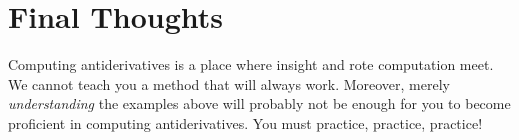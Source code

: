 \documentclass{ximera}
\begin{document}
\section{Final Thoughts}
Computing antiderivatives is a place where insight and rote
computation meet. We cannot teach you a method that will always
work. Moreover, merely \emph{understanding} the examples above will
probably not be enough for you to become proficient in computing
antiderivatives. You must practice, practice, practice!
\end{document}
